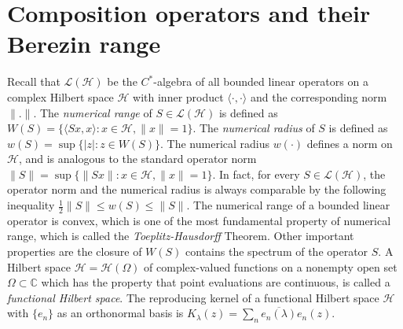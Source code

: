 \documentclass[12pt, reqno]{amsart}
\theoremstyle{definition}
\theoremstyle{remark}
\numberwithin{equation}{section}
\begin{document}
\section{Composition operators and their Berezin range}

Recall that ${\mathcal{L}}(\mathcal{H})$ be the $C^*$-algebra of all bounded linear operators on a complex Hilbert space $\mathcal{H}$ with inner product $\langle \cdot,\cdot\rangle$ and the corresponding norm $\|.\|$. 
The {\it numerical range} of $S\in
\mathcal{L(H)}$ is defined as
$ W(S)=\{\langle Sx, x \rangle: x\in \mathcal{H}, \|x\|=1
\}.$ 
The {\it numerical radius} of $S$ is
defined as $ w(S)=\displaystyle\sup\{|z|: z\in W(S) \}.$
The numerical radius
$w(\cdot)$ defines a norm on $\mathcal{H}$, and is analogous to the standard operator norm $\|S\|=\displaystyle \sup  \{ \|Sx \|: x\in \mathcal{H}, \|x\|=1 \}.$ In fact, for
every $S \in \mathcal{L(H)}$, the operator norm and the numerical radius is always comparable by the following inequality
$\frac{1}{2}\|S\|\leq w(S)\leq \|S\|.$
The numerical range of a bounded linear operator is convex, which is one of the most fundamental property of numerical range, which is called the \textit{Toeplitz-Hausdorff} Theorem. Other important properties are  the closure of $W(S)$ contains the spectrum of the operator $S$.
A Hilbert space $\mathcal{H}=\mathcal{H}(\Omega)$ of complex-valued functions on a nonempty open set $\Omega\subset \mathbb{C}$ which has the property that point evaluations are continuous, is called a  {\it functional Hilbert space}. 
The reproducing kernel of a functional Hilbert space $\mathcal{H}$ with $\{e_n\}$ as an orthonormal basis is  $K_\lambda(z)=\displaystyle \sum_n \overline{e_n(\lambda)}e_n(z)$.
\end{document}
